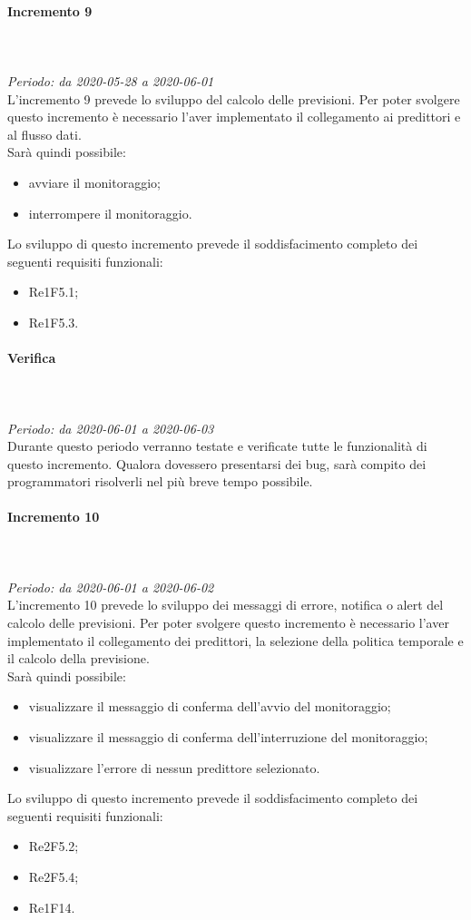 \paragraph{Incremento 9}\mbox{} \\ \mbox{} \\ 
\textit{Periodo: da 2020-05-28 a 2020-06-01}\\
L’incremento 9 prevede lo sviluppo del calcolo delle previsioni. Per poter svolgere questo incremento è necessario l'aver implementato il collegamento ai predittori e al flusso dati. \\
Sarà quindi possibile:
\begin{itemize}
	\item avviare il monitoraggio;
	\item interrompere il monitoraggio.
\end{itemize}
Lo sviluppo di questo incremento prevede il soddisfacimento completo dei seguenti requisiti funzionali:
\begin{itemize}
\item Re1F5.1;
\item Re1F5.3.
\end{itemize}
\paragraph*{Verifica}\mbox{} \\ \mbox{} \\ 
\textit{Periodo: da 2020-06-01 a 2020-06-03}\\
Durante questo periodo verranno testate e verificate tutte le funzionalità di questo incremento. Qualora dovessero presentarsi dei bug, sarà compito dei programmatori risolverli nel più breve tempo possibile.

\paragraph{Incremento 10}\mbox{} \\ \mbox{} \\ 
\textit{Periodo: da 2020-06-01 a 2020-06-02}\\
L’incremento 10 prevede lo sviluppo dei messaggi di errore, notifica o alert del calcolo delle previsioni. Per poter svolgere questo incremento è necessario l'aver implementato il collegamento dei predittori, la selezione della politica temporale e il calcolo della previsione. \\
Sarà quindi possibile:
\begin{itemize}
	\item visualizzare il messaggio di conferma dell'avvio del monitoraggio;
	\item visualizzare il messaggio di conferma dell'interruzione del monitoraggio;
	\item visualizzare l'errore di nessun predittore selezionato.
\end{itemize}
Lo sviluppo di questo incremento prevede il soddisfacimento completo dei seguenti requisiti funzionali:
\begin{itemize}
\item Re2F5.2;
\item Re2F5.4;
\item Re1F14.
\end{itemize}
